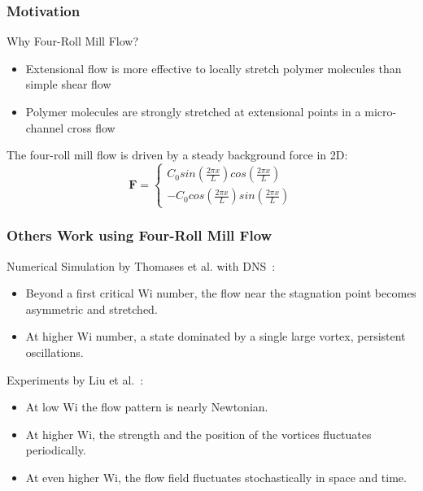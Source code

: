 \begin{frame}
  \frametitle{Motivation}

  \begin{block}{Why Four-Roll Mill Flow?}
    \begin{itemize}
    \item Extensional flow is more effective to locally 
      stretch polymer molecules than simple shear flow
    \item Polymer molecules are strongly stretched at extensional points in a micro-channel cross flow
    \end{itemize}

  \end{block}
  The four-roll mill flow is driven by a steady background force in 2D:
  \begin{equation}
    \mathbf{F}=\left\{\begin{matrix}
        C_0sin(\frac{2\pi x} {L})cos(\frac{2\pi x} {L})
        \\ 
        -C_0cos(\frac{2\pi x} {L})sin(\frac{2\pi x} {L})
      \end{matrix}\right.
  \end{equation}
\end{frame}

\begin{frame}
  \frametitle{Others Work using Four-Roll Mill Flow}
  \begin{block}{Numerical Simulation by Thomases et al. with DNS~\footnotemark: }
    \begin{itemize}
    \item Beyond a first critical Wi number, the flow near the stagnation point becomes asymmetric and stretched.
    \item At higher Wi number, a state dominated by a single large vortex, persistent oscillations. 
    \end{itemize}
  \end{block}
  \begin{block}{Experiments by Liu et al.~\footnotemark[2]:}
    \begin{itemize}
    \item  At low Wi the flow pattern is nearly Newtonian. 
    \item At higher Wi, the strength and the position of the vortices fluctuates periodically.
    \item At even higher Wi, the flow field fluctuates stochastically in space and time.
    \end{itemize}
  \end{block}
\end{frame}

